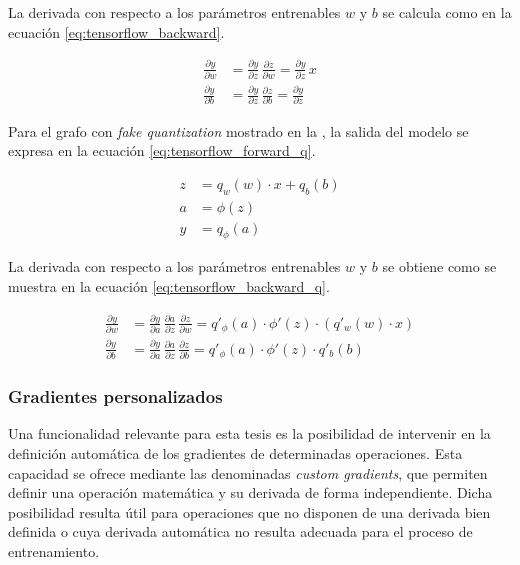 La derivada con respecto a los parámetros entrenables $w$ y $b$ se calcula como en la ecuación \ref{eq:tensorflow_backward}.

\begin{equation}
    \label{eq:tensorflow_backward}
    \begin{aligned}
        \frac{\partial y}{\partial w} &= \frac{\partial y}{\partial z}\,\frac{\partial z}{\partial w} = \frac{\partial y}{\partial z}\,x \\
        \frac{\partial y}{\partial b} &= \frac{\partial y}{\partial z}\,\frac{\partial z}{\partial b} = \frac{\partial y}{\partial z}
    \end{aligned}
\end{equation}

Para el grafo con \textit{fake quantization} mostrado en la , la salida del modelo se expresa en la ecuación \ref{eq:tensorflow_forward_q}.

\begin{equation}
    \label{eq:tensorflow_forward_q}
    \begin{aligned}
        z &= q_w(w) \cdot x + q_b(b) \\
        a &= \phi(z) \\
        y &= q_\phi(a)
    \end{aligned}
\end{equation}

La derivada con respecto a los parámetros entrenables $w$ y $b$ se obtiene como se muestra en la ecuación \ref{eq:tensorflow_backward_q}.

\begin{equation}
    \label{eq:tensorflow_backward_q}
    \begin{aligned}
        \frac{\partial y}{\partial w} &= \frac{\partial y}{\partial a}\,\frac{\partial a}{\partial z}\,\frac{\partial z}{\partial w} = q'_\phi(a) \cdot \phi'(z) \cdot (q'_w(w) \cdot x) \\
        \frac{\partial y}{\partial b} &= \frac{\partial y}{\partial a}\,\frac{\partial a}{\partial z}\,\frac{\partial z}{\partial b} = q'_\phi(a) \cdot \phi'(z) \cdot q'_b(b)
    \end{aligned}
\end{equation}

\subsubsection{Gradientes personalizados}
\label{sec:gradientes_personalizados}
Una funcionalidad relevante para esta tesis es la posibilidad de intervenir en la definición automática de los gradientes de determinadas operaciones. Esta capacidad se ofrece mediante las denominadas \textit{custom gradients}, que permiten definir una operación matemática y su derivada de forma independiente. Dicha posibilidad resulta útil para operaciones que no disponen de una derivada bien definida o cuya derivada automática no resulta adecuada para el proceso de entrenamiento.

